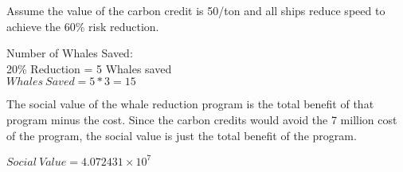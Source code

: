 \documentclass[10pt,]{article}
\begin{document}
Assume the value of the carbon credit is 50/ton and all ships reduce
speed to achieve the 60\% risk reduction.

Number of Whales Saved:\\
20\% Reduction = 5 Whales saved\\
\(Whales~Saved = 5*3 = 15\)

The social value of the whale reduction program is the total benefit of
that program minus the cost. Since the carbon credits would avoid the 7
million cost of the program, the social value is just the total benefit
of the program.

\(Social~Value = 4.072431\times 10^{7}\)
\end{document}
